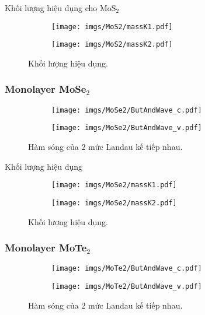 \documentclass{article}
\begin{document}
Khối lượng hiệu dụng cho MoS$_{2}$

\begin{figure}[htb]
	\begin{subfigure}{0.495\textwidth}
		\centering
		\texttt{[image: imgs/MoS2/massK1.pdf]}
	\end{subfigure}
	\begin{subfigure}{0.495\textwidth}
		\centering
		\texttt{[image: imgs/MoS2/massK2.pdf]}
	\end{subfigure}
	\caption{Khối lượng hiệu dụng.}
\end{figure}
\newpage
\subsubsection*{Monolayer MoSe$_{2}$}
\begin{figure}[htb]
	\begin{subfigure}{0.495\textwidth}
		\centering
		\texttt{[image: imgs/MoSe2/ButAndWave\_c.pdf]}
	\end{subfigure}
	\begin{subfigure}{0.495\textwidth}
		\centering
		\texttt{[image: imgs/MoSe2/ButAndWave\_v.pdf]}
	\end{subfigure}
	\caption{Hàm sóng của 2 mức Landau kế tiếp nhau.}
\end{figure}
Khối lượng hiệu dụng

\begin{figure}[htb]
	\begin{subfigure}{0.495\textwidth}
		\centering
		\texttt{[image: imgs/MoSe2/massK1.pdf]}
	\end{subfigure}
	\begin{subfigure}{0.495\textwidth}
		\centering
		\texttt{[image: imgs/MoSe2/massK2.pdf]}
	\end{subfigure}
	\caption{Khối lượng hiệu dụng.}
\end{figure}

\newpage
\subsubsection*{Monolayer MoTe$_{2}$}
\begin{figure}[htb]
	\begin{subfigure}{0.495\textwidth}
		\centering
		\texttt{[image: imgs/MoTe2/ButAndWave\_c.pdf]}
	\end{subfigure}
	\begin{subfigure}{0.495\textwidth}
		\centering
		\texttt{[image: imgs/MoTe2/ButAndWave\_v.pdf]}
	\end{subfigure}
	\caption{Hàm sóng của 2 mức Landau kế tiếp nhau.}
\end{figure}
\end{document}
